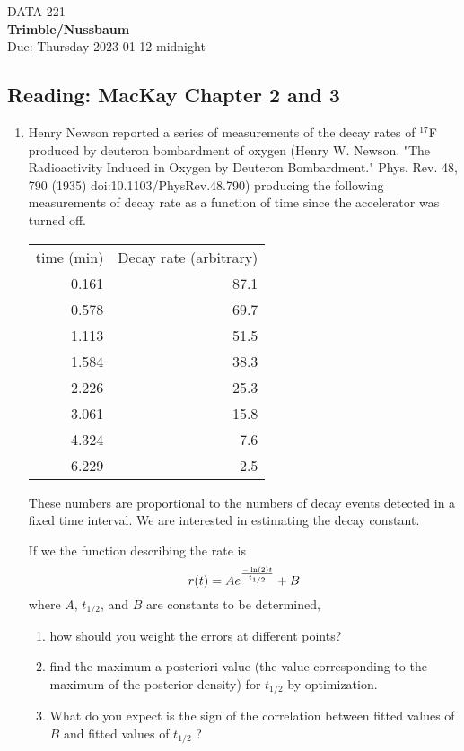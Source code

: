\documentclass[12pt]{book}
\theoremstyle{definition}
\begin{document}
\begin{center}
{\Large DATA 221   }\\
\textbf{Trimble/Nussbaum}\\ %
Due: Thursday 2023-01-12  midnight
\end{center}

\vspace{0.2 cm}

\subsection*{Reading:  MacKay Chapter 2 and 3}

\begin{enumerate}
\item
Henry Newson reported a series of measurements of the decay rates of $^{17}$F produced by deuteron bombardment of oxygen
(Henry W. Newson.  "The Radioactivity Induced in Oxygen by Deuteron Bombardment." Phys. Rev. 48, 790 (1935) doi:10.1103/PhysRev.48.790)
producing the following measurements of decay rate as a function of time since the accelerator was turned off.

\begin{tabular}{rr} \\
time (min) &    Decay rate (arbitrary) \\
0.161 & 87.1 \\
0.578 & 69.7 \\
1.113 & 51.5 \\
1.584 & 38.3 \\
2.226 & 25.3 \\
3.061 & 15.8 \\
4.324 & 7.6 \\
6.229 & 2.5 \\
\end{tabular}

These numbers are proportional to the numbers of decay events detected in a fixed time interval. 
We are interested in estimating the decay constant.  

If we the function describing the rate is 
$$ r(t) = A e ^{ - \ln (2) t \over t_{1/2} } + B $$
where $A$, $t_{1/2}$, and $B$ are constants to be determined,
\begin{enumerate}
\item 
how should you weight the errors at different points?
\item 
find the maximum a posteriori value (the value corresponding to the  maximum of the posterior density) for $t_{1/2} $ by optimization.
\item 
What do you expect is the sign of the correlation between fitted values of $B$ and fitted values of $t_{1/2}$ ?
\end{enumerate}


\end{enumerate}
\end{document}

